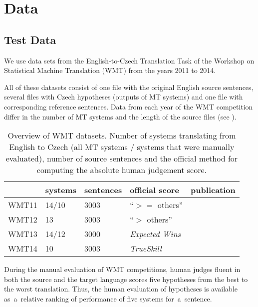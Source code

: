 \chapter{Data}
\label{data}

\section{Test Data}

We use data sets from the English-to-Czech Translation Task of the Workshop on
Statistical Machine Translation (WMT) from the years 2011 to 2014.

All of these datasets consist of one file with the original English source sentences,
several files with Czech hypotheses (outputs of MT systems) and one file with corresponding 
reference sentences. Data from each year of the WMT competition differ in the 
number of MT systems and the length of the source files (see ). 


\begin{table}[h]
\centering
\begin{tabular}{l|l|l|l|l}
      & systems & sentences & official score & publication\\
\hline
WMT11 & 14/10    & 3003      & “$ >= $ others”      & \cite{wmt11}  \\
WMT12 & 13          & 3003      & “$ > $ others”      & \cite{wmt12}  \\
WMT13 & 14/12    & 3000      & \textit{Expected Wins} & \cite{wmt13}  \\
WMT14 & 10          & 3003      & \textit{TrueSkill}   & \cite{wmt14}
\end{tabular}
\caption{Overview of WMT datasets. Number of systems translating from English 
to Czech (all MT systems / systems that were manually evaluated), number of 
source sentences and the official method for computing the absolute human 
judgement score.}
\label{wmt-data}
\end{table}

During the manual evaluation of WMT competitions, human judges fluent in both
the source and the target language scores five hypotheses from the best to
the worst translation. Thus, the human evaluation of hypotheses is available 
as~a~relative ranking of performance of five systems for~a~sentence. 

